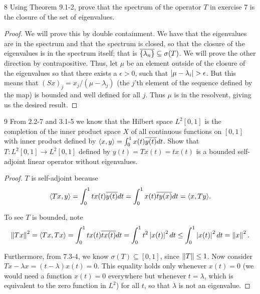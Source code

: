 \begin{exercise}{8}
Using Theorem 9.1-2, prove that the spectrum of the operator $T$ in exercise 7 is the closure of the set of eigenvalues.
\end{exercise}
\begin{proof}
We will prove this by double containment.
We have that the eigenvalues are in the spectrum and that the spectrum is closed, so that the closure of the eigenvalues is in the spectrum itself;
that is $\overline{\{\lambda_n\}} \subseteq \sigma(T)$.
We will prove the other direction by contrapositive.
Thus, let $\mu$ be an element outside of the closure of the eigenvalues so that there exists a $\epsilon > 0$, such that $\left\lvert \mu - \lambda_i\right\rvert > \epsilon$.
But this means that $(Sx)_j = x_j/(\mu - \lambda_j)$ (the $j$'th element of the sequence defined by the map) is bounded and well defined for all $j$.
Thus $\mu$ is in the resolvent, giving us the desired result.
\end{proof} 

\begin{exercise}{9}
From 2.2-7 and 3.1-5 we know that the Hilbert space $L^2 [0, 1]$ is the completion of the inner product space $X$ of all continuous functions on $[0, 1]$ with inner product defined by $\langle x, y\rangle = \int_0^1 x(t) \overline{y(t)} dt$.
Show that $T: L^2 [0, 1] \to L^2 [0, 1]$ defined by $y(t) = T x(t) = t x(t)$ is a bounded self-adjoint linear operator without eigenvalues.
\end{exercise}
\begin{proof}
$T$ is self-adjoint because 
\begin{align*}
    \langle Tx, y\rangle 
    = \int_0^1 t x(t) \overline{y(t)} dt 
    = \int_0^1 x(t) \overline{t y(x)} dt 
    = \langle x, Ty\rangle.
\end{align*}

To see $T$ is bounded, note
\begin{align*}
    \left\lVert T x\right\rVert^2
    = \langle Tx, Tx\rangle
    = \int_0^1 t x(t) \overline{t x(t)} dt
    = \int_0^1 t^2 \left\lvert x(t)\right\rvert^2 dt
    \leq \int_0^1 \left\lvert x(t)\right\rvert^2 dt
    = \left\lVert x\right\rVert^2.
\end{align*}

Furthermore, from 7.3-4, we know $\sigma(T) \subseteq [0, 1]$, since $\left\lVert T\right\rVert \leq 1$.
Now consider $Tx - \lambda x = (t - \lambda) x(t) = 0$.
This equality holds only whenever $x(t) = 0$ (we would need a function $x(t) = 0$ everywhere but whenever $t = \lambda$, which is equivalent to the zero function in $L^2$) for all $t$, so that $\lambda$ is not an eigenvalue.
\end{proof} 

